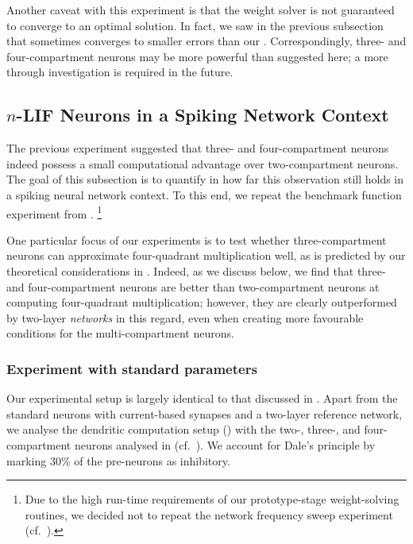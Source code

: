 Another caveat with this experiment is that the weight solver is not guaranteed to converge to an optimal solution.
In fact, we saw in the previous subsection that \SGD sometimes converges to smaller errors than our \SQP.
Correspondingly, three- and four-compartment neurons may be more powerful than suggested here; a more through investigation is required in the future.

\subsection{$n$-LIF Neurons in a Spiking Network Context}
\label{sec:nlif_experiment_3}

The previous experiment suggested that three- and four-compartment neurons indeed possess a small computational advantage over two-compartment neurons.
The goal of this subsection is to quantify in how far this observation still holds in a spiking neural network context.
To this end, we repeat the benchmark function experiment from .%
\footnote{
Due to the high run-time requirements of our prototype-stage weight-solving routines, we decided not to repeat the network frequency sweep experiment (cf.~).
}

One particular focus of our experiments is to test whether three-compartment neurons can approximate four-quadrant multiplication well, as is predicted by our theoretical considerations in .
Indeed, as we discuss below, we find that three- and four-compartment neurons are better than two-compartment neurons at computing four-quadrant multiplication; however, they are clearly outperformed by two-layer \emph{networks} in this regard, even when creating more favourable conditions for the multi-compartment neurons.

\subsubsection{Experiment with standard parameters}
Our experimental setup is largely identical to that discussed in .
Apart from the standard \LIF neurons with current-based synapses and a two-layer \LIF reference network, we analyse the dendritic computation setup () with the two-, three-, and four-compartment neurons analysed in  (cf.~).
We account for Dale's principle by marking $30\%$ of the pre-neurons as inhibitory.

